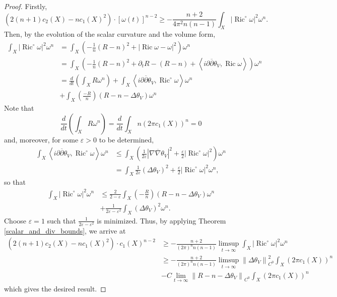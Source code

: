 \documentclass[12pt]{article}
\numberwithin{equation}{section}
\renewcommand{\d}{\partial}
\newcommand{\dbar}{\overline{\partial}}
\newcommand{\e}{\varepsilon}
\DeclareMathOperator{\Ric}{Ric}
\newcommand{\oo}[1]{\overline{#1}}
\newcommand{\norm}[1]{\left\|#1\right\|}
\newcommand{\ip}[1]{\left\langle#1\right\rangle}
\begin{document}
\begin{proof}
Firstly,
\begin{equation*}
    (2(n+1) c_2(X) - n c_1(X)^2) \cdot [\omega(t)]^{n-2} \geq - \frac{n+2}{4 \pi^2 n(n-1)} \int_X |\Ric^\circ \omega|^2 \omega^n.
\end{equation*}
Then, by the evolution of the scalar curvature and the volume form,
\begin{align*}
    \int_X |\Ric^\circ \omega|^2 \omega^n &= \int_X \left(- \frac{1}{n}(R-n)^2 + |\Ric \omega - \omega|^2 \right)\omega^n \\
    &= \int_X \left(- \frac{1}{n}(R-n)^2 + \d_t R - (R-n) + \ip{i\d\dbar \theta_V, \Ric \omega} \right)\omega^n \\
    &= \frac{d}{dt} \left(\int_X R \omega^n\right) + \int_{X} \ip{i\d\dbar \theta_V, \Ric^\circ \omega} \omega^n\\
    &+\int_X \left(\frac{-R}{n}\right)(R - n - \Delta \theta_V) \omega^n
\end{align*}
Note that
\begin{equation*}
    \frac{d}{dt} \left(\int_X R \omega^n\right) = \frac{d}{dt} \int_X n (2\pi c_1(X))^n = 0
\end{equation*}
and, moreover, for some $\e > 0$ to be determined,
\begin{align*}
    \int_X \ip{i\d\dbar \theta_V, \Ric^{\circ} \omega} \omega^n &\leq \int_X \left(\frac{1}{2 \e} |\nabla \oo{\nabla} \theta_V|^2 + \frac{\e}{2} |\Ric^{\circ} \omega |^2 \right)\omega^n\\
    &= \int_X \frac{1}{2 \e} (\Delta \theta_V)^2 + \frac{\e}{2} |\Ric^{\circ} \omega|^2 \omega^n,
\end{align*}
so that
\begin{align*}
    \int_X |\Ric^\circ \omega|^2 \omega^n &\leq \frac{2}{2-\e}\int_X \left(-\frac{R}{n}\right) (R - n - \Delta \theta_V) \omega^n \\
    &+ \frac{1}{2\e - \e^2} \int_X (\Delta \theta_V)^2 \omega^n.
\end{align*}
Choose $\e = 1$ such that $\frac{1}{2\e - \e^2}$ is minimized. Thus, by applying Theorem \ref{scalar_and_div_bounds}, we arrive at
\begin{align*}
    (2(n+1) c_2(X) - n c_1(X)^2) \cdot c_1(X)^{n-2} &\geq -\frac{n+2}{(2\pi)^{n}n(n-1)} \limsup_{t \to \infty} \int_X |\Ric^\circ \omega|^2 \omega^n\\
    &\geq -\frac{n+2}{(2\pi)^n n(n-1)} \limsup_{t \to \infty}\norm{\Delta \theta_V}^2_{C^0} \int_X (2 \pi c_1(X))^n\\
    &- C \lim_{t \to \infty} \norm{R - n - \Delta \theta_V}_{C^0} \int_X (2 \pi c_1(X))^n
\end{align*}
which gives the desired result.
\end{proof}
\end{document}
